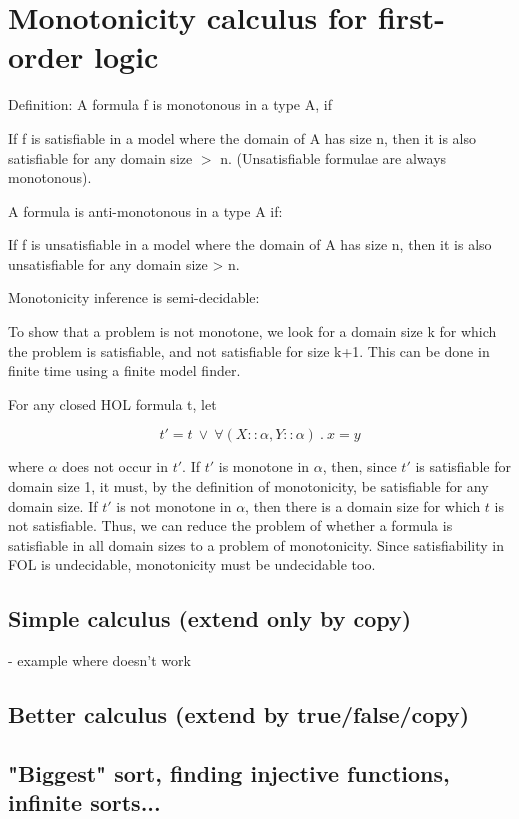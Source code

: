 \section{Monotonicity calculus for first-order logic}


Definition:
A formula f is monotonous in a type A, if

  If f is satisfiable in a model where the domain of A has size n,
  then it is also satisfiable for any domain size $>$ n.
  (Unsatisfiable formulae are always monotonous).

A formula is anti-monotonous in a type A if:

  If f is unsatisfiable in a model where the domain of A has size n,
  then it is also unsatisfiable for any domain size > n.

Monotonicity inference is semi-decidable:

To show that a problem is not monotone, we look for a domain size
k for which the problem is satisfiable, and not satisfiable for size k+1.
This can be done in finite time using a finite model finder.

For any closed HOL formula t, let

$$t' = t\ \vee \  \forall (X :: \alpha,Y :: \alpha)\ .\ x = y$$

where $\alpha$ does not occur in $t'$. 
If $t'$ is monotone in $\alpha$, then, since $t'$ is satisfiable for domain size 1, it must, by the definition of
monotonicity, be satisfiable for any domain size.
If $t'$ is not monotone in $\alpha$, then there is a domain size for which $t$ is not satisfiable.
Thus, we can reduce the problem of whether a formula is satisfiable in all domain sizes to a problem of monotonicity.
Since satisfiability in FOL is undecidable, monotonicity must be undecidable too.

\subsection{Simple calculus (extend only by copy)}

- example where doesn't work

\subsection{Better calculus (extend by true/false/copy)}


\subsection{ "Biggest" sort, finding injective functions, infinite sorts...}
























